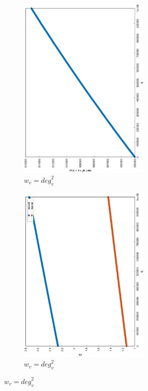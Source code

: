 \documentclass[12pt]{report}
\begin{document}
\begin{figure}
\begin{subfigure}{0.35\textwidth}
	\includegraphics[width=0.7\textwidth,angle=-90]{graph/uniform_coverage_1000000_10000000_0.1_power_2.eps}
	\caption{$ w_v = \mathit{deg}_v^2 $}
\end{subfigure}
\begin{subfigure}{0.35\textwidth}
	\includegraphics[width=0.7\textwidth,angle=-90]{graph/uniform_q_1000000_10000000_0.1_power_2.eps}
	\caption{$ w_v = \mathit{deg}_v^2 $}
\end{subfigure}


\end{figure}
\end{document}
